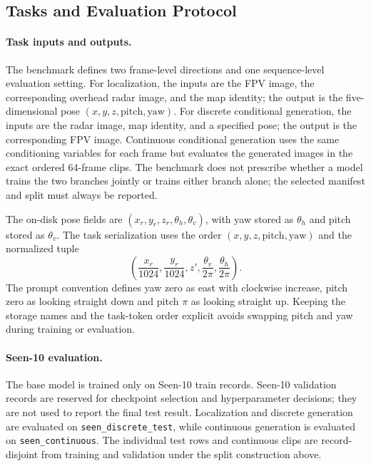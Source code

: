 \subsection{Tasks and Evaluation Protocol}
\label{subsec:benchmark-tasks}

\paragraph{Task inputs and outputs.}
The benchmark defines two frame-level directions and one sequence-level
evaluation setting.  For localization, the inputs are the FPV image, the
corresponding overhead radar image, and the map identity; the output is the
five-dimensional pose $(x,y,z,\mathrm{pitch},\mathrm{yaw})$.  For discrete
conditional generation, the inputs are the radar image, map identity, and a
specified pose; the output is the corresponding FPV image.  Continuous
conditional generation uses the same conditioning variables for each frame
but evaluates the generated images in the exact ordered 64-frame clips.
The benchmark does not prescribe whether a model trains the two branches
jointly or trains either branch alone; the selected manifest and split must
always be reported.

The on-disk pose fields are $(x_r,y_r,z_r,\theta_h,\theta_v)$, with yaw
stored as $\theta_h$ and pitch stored as $\theta_v$.  The task serialization
uses the order $(x,y,z,\mathrm{pitch},\mathrm{yaw})$ and the normalized tuple
\begin{equation}
    \left(\frac{x_r}{1024},\frac{y_r}{1024},z',
    \frac{\theta_v}{2\pi},\frac{\theta_h}{2\pi}\right).
\end{equation}
The prompt convention defines yaw zero as east with clockwise increase,
pitch zero as looking straight down and pitch $\pi$ as looking straight up.
Keeping the storage names and the task-token order explicit avoids swapping
pitch and yaw during training or evaluation.

\paragraph{Seen-10 evaluation.}
The base model is trained only on Seen-10 train records.  Seen-10 validation
records are reserved for checkpoint selection and hyperparameter decisions;
they are not used to report the final test result.  Localization and
discrete generation are evaluated on \texttt{seen\_discrete\_test}, while
continuous generation is evaluated on \texttt{seen\_continuous}.  The
individual test rows and continuous clips are record-disjoint from training
and validation under the split construction above.

